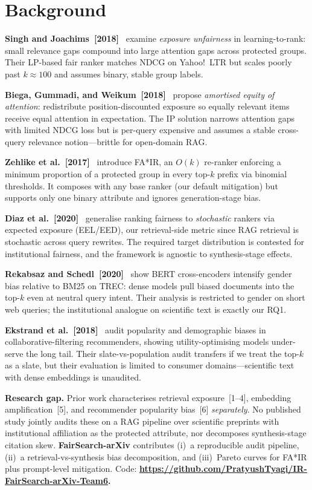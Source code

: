 \documentclass[sigconf]{acmart}
\begin{document}
\section{Background}

\textbf{Singh and Joachims~[2018]}~\cite{singh2018} examine \emph{exposure unfairness} in learning-to-rank: small relevance gaps compound into large attention gaps across protected groups. Their LP-based fair ranker matches NDCG on Yahoo!\ LTR but scales poorly past $k\!\approx\!100$ and assumes binary, stable group labels.

\textbf{Biega, Gummadi, and Weikum~[2018]}~\cite{biega2018} propose \emph{amortised equity of attention}: redistribute position-discounted exposure so equally relevant items receive equal attention in expectation. The IP solution narrows attention gaps with limited NDCG loss but is per-query expensive and assumes a stable cross-query relevance notion---brittle for open-domain RAG.

\textbf{Zehlike et al.~[2017]}~\cite{zehlike2017} introduce FA*IR, an $O(k)$ re-ranker enforcing a minimum proportion of a protected group in every top-$k$ prefix via binomial thresholds. It composes with any base ranker (our default mitigation) but supports only one binary attribute and ignores generation-stage bias.

\textbf{Diaz et al.~[2020]}~\cite{diaz2020} generalise ranking fairness to \emph{stochastic} rankers via expected exposure (EEL/EED), our retrieval-side metric since RAG retrieval is stochastic across query rewrites. The required target distribution is contested for institutional fairness, and the framework is agnostic to synthesis-stage effects.

\textbf{Rekabsaz and Schedl~[2020]}~\cite{rekabsaz2020} show BERT cross-encoders intensify gender bias relative to BM25 on TREC: dense models pull biased documents into the top-$k$ even at neutral query intent. Their analysis is restricted to gender on short web queries; the institutional analogue on scientific text is exactly our RQ1.

\textbf{Ekstrand et al.~[2018]}~\cite{ekstrand2018} audit popularity and demographic biases in collaborative-filtering recommenders, showing utility-optimising models under-serve the long tail. Their slate-vs-population audit transfers if we treat the top-$k$ as a slate, but their evaluation is limited to consumer domains---scientific text with dense embeddings is unaudited.

\textbf{Research gap.} Prior work characterises retrieval exposure~[1--4], embedding amplification~[5], and recommender popularity bias~[6] \emph{separately}. No published study jointly audits these on a RAG pipeline over scientific preprints with institutional affiliation as the protected attribute, nor decomposes synthesis-stage citation skew. \textbf{FairSearch-arXiv} contributes (i)~a reproducible audit pipeline, (ii)~a retrieval-vs-synthesis bias decomposition, and (iii)~Pareto curves for FA*IR plus prompt-level mitigation. Code: \textbf{\url{https://github.com/PratyushTyagi/IR-FairSearch-arXiv-Team6}.}
\end{document}
